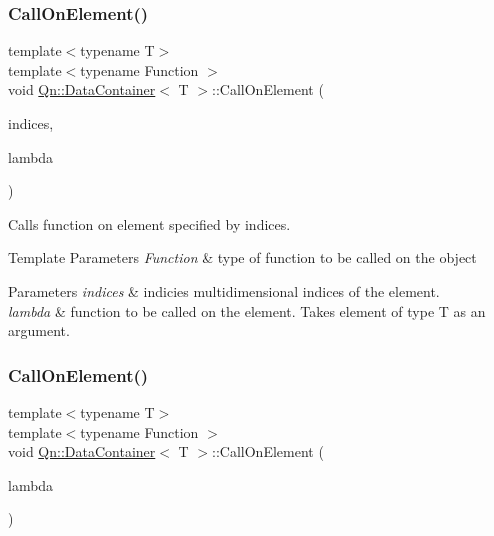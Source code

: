 \subsubsection{\texorpdfstring{Call\+On\+Element()}{CallOnElement()}\hspace{0.1cm}{\footnotesize\ttfamily [1/4]}}
{\footnotesize\ttfamily template$<$typename T$>$ \\
template$<$typename Function $>$ \\
void \mbox{\hyperlink{classQn_1_1DataContainer}{Qn\+::\+Data\+Container}}$<$ T $>$\+::Call\+On\+Element (\begin{DoxyParamCaption}\item[{const typename std\+::vector$<$ size\+\_\+type $>$ \&}]{indices,  }\item[{Function \&\&}]{lambda }\end{DoxyParamCaption})\hspace{0.3cm}{\ttfamily [inline]}}

Calls function on element specified by indices. 
\begin{DoxyTemplParams}{Template Parameters}
{\em Function} & type of function to be called on the object \\
\hline
\end{DoxyTemplParams}

\begin{DoxyParams}{Parameters}
{\em indices} & indicies multidimensional indices of the element. \\
\hline
{\em lambda} & function to be called on the element. Takes element of type T as an argument. \\
\hline
\end{DoxyParams}
\mbox{\label{classQn_1_1DataContainer_a1fa55b9f9adc8a07b3a4d7ed51b5516b}} 
\subsubsection{\texorpdfstring{Call\+On\+Element()}{CallOnElement()}\hspace{0.1cm}{\footnotesize\ttfamily [2/4]}}
{\footnotesize\ttfamily template$<$typename T$>$ \\
template$<$typename Function $>$ \\
void \mbox{\hyperlink{classQn_1_1DataContainer}{Qn\+::\+Data\+Container}}$<$ T $>$\+::Call\+On\+Element (\begin{DoxyParamCaption}\item[{Function \&\&}]{lambda }\end{DoxyParamCaption})\hspace{0.3cm}{\ttfamily [inline]}}

